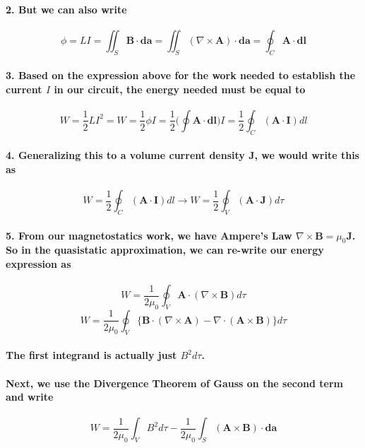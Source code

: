 \documentclass{article}
\begin{document}
\paragraph{2. But we can also write}
\begin{equation*}
    \phi=LI=\iint_S\boldsymbol{B}\cdot\boldsymbol{da}=\iint_S(\nabla\times\boldsymbol{A})\cdot\boldsymbol{da}=\oint_C\boldsymbol{A}\cdot\boldsymbol{dl}
\end{equation*}
\paragraph{3. Based on the expression above for the work needed to establish the current $I$ in our circuit, the energy needed must be equal to}
\begin{equation*}
    W=\frac{1}{2}LI^2=W=\frac{1}{2}\phi I=\frac{1}{2}\bigg(\oint\boldsymbol{A}\cdot\boldsymbol{dl}\bigg)I=\frac{1}{2}\oint_C(\boldsymbol{A}\cdot\boldsymbol{I})dl
\end{equation*}
\paragraph{4. Generalizing this to a volume current density $\boldsymbol{J}$, we would write this as}
\begin{equation*}
    W=\frac{1}{2}\oint_C(\boldsymbol{A}\cdot\boldsymbol{I})dl\rightarrow W=\frac{1}{2}\oint_V(\boldsymbol{A}\cdot\boldsymbol{J})d\tau
\end{equation*}
\paragraph{5. From our magnetostatics work, we have Ampere's Law $\nabla\times\boldsymbol{B}=\mu_0\boldsymbol{J}$. So in the quasistatic approximation, we can re-write our energy expression as}
\begin{equation*}
    W=\frac{1}{2\mu_0}\oint_V\boldsymbol{A}\cdot(\nabla\times\boldsymbol{B})d\tau
\end{equation*}
\begin{equation*}
    W=\frac{1}{2\mu_0}\oint_V\{ \boldsymbol{B}\cdot(\nabla\times\boldsymbol{A})-\nabla\cdot(\boldsymbol{A}\times\boldsymbol{B})\} d\tau
\end{equation*}
\paragraph{\indent The first integrand is actually just $B^2d\tau$.}
\paragraph{\indent Next, we use the Divergence Theorem of Gauss on the second term and write}
\begin{equation*}
    W=\frac{1}{2\mu_0}\int_VB^2d\tau-\frac{1}{2\mu_0}\int_S(\boldsymbol{A}\times\boldsymbol{B})\cdot\boldsymbol{da}
\end{equation*}
\end{document}
